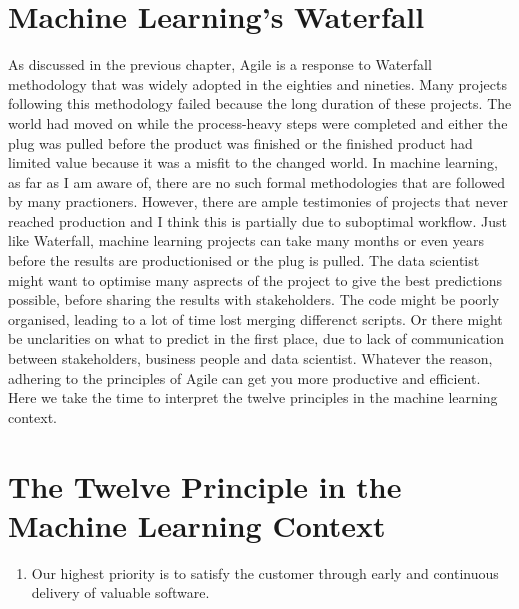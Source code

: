 \documentclass[]{book}
\providecommand{\tightlist}{%
  \setlength{\itemsep}{0pt}\setlength{\parskip}{0pt}}
\begin{document}
\hypertarget{machine-learnings-waterfall}{%
\section{Machine Learning's Waterfall}\label{machine-learnings-waterfall}}

As discussed in the previous chapter, Agile is a response to Waterfall methodology that was widely adopted in the eighties and nineties. Many projects following this methodology failed because the long duration of these projects. The world had moved on while the process-heavy steps were completed and either the plug was pulled before the product was finished or the finished product had limited value because it was a misfit to the changed world. In machine learning, as far as I am aware of, there are no such formal methodologies that are followed by many practioners. However, there are ample testimonies of projects that never reached production and I think this is partially due to suboptimal workflow. Just like Waterfall, machine learning projects can take many months or even years before the results are productionised or the plug is pulled. The data scientist might want to optimise many asprects of the project to give the best predictions possible, before sharing the results with stakeholders. The code might be poorly organised, leading to a lot of time lost merging differenct scripts. Or there might be unclarities on what to predict in the first place, due to lack of communication between stakeholders, business people and data scientist. Whatever the reason, adhering to the principles of Agile can get you more productive and efficient. Here we take the time to interpret the twelve principles in the machine learning context.

\hypertarget{the-twelve-principle-in-the-machine-learning-context}{%
\section{The Twelve Principle in the Machine Learning Context}\label{the-twelve-principle-in-the-machine-learning-context}}

\begin{enumerate}
\def\labelenumi{\arabic{enumi})}
\tightlist
\item
  Our highest priority is to satisfy the customer through early and continuous delivery of valuable software.
\end{enumerate}
\end{document}
